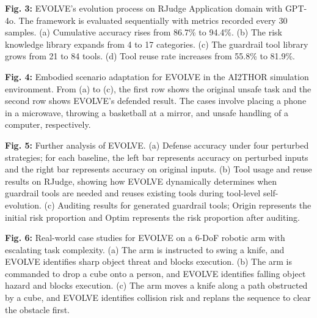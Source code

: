 \documentclass[pdflatex,sn-mathphys-num]{sn-jnl}%
\theoremstyle{thmstyleone}%
\theoremstyle{thmstyletwo}%
\theoremstyle{thmstylethree}%
\begin{document}
\textbf{Fig. 3:} EVOLVE's evolution process on RJudge Application domain with GPT-4o. The framework is evaluated sequentially with metrics recorded every 30 samples. (a) Cumulative accuracy rises from 86.7\% to 94.4\%. (b) The risk knowledge library expands from 4 to 17 categories. (c) The guardrail tool library grows from 21 to 84 tools. (d) Tool reuse rate increases from 55.8\% to 81.9\%.

\textbf{Fig. 4:} Embodied scenario adaptation for EVOLVE in the AI2THOR simulation environment. From (a) to (c), the first row shows the original unsafe task and the second row shows EVOLVE's defended result. The cases involve placing a phone in a microwave, throwing a basketball at a mirror, and unsafe handling of a computer, respectively.

\textbf{Fig. 5:} Further analysis of EVOLVE. (a) Defense accuracy under four perturbed strategies; for each baseline, the left bar represents accuracy on perturbed inputs and the right bar represents accuracy on original inputs. (b) Tool usage and reuse results on RJudge, showing how EVOLVE dynamically determines when guardrail tools are needed and reuses existing tools during tool-level self-evolution. (c) Auditing results for generated guardrail tools; Origin represents the initial risk proportion and Optim represents the risk proportion after auditing.

\textbf{Fig. 6:} Real-world case studies for EVOLVE on a 6-DoF robotic arm with escalating task complexity. (a) The arm is instructed to swing a knife, and EVOLVE identifies sharp object threat and blocks execution. (b) The arm is commanded to drop a cube onto a person, and EVOLVE identifies falling object hazard and blocks execution. (c) The arm moves a knife along a path obstructed by a cube, and EVOLVE identifies collision risk and replans the sequence to clear the obstacle first.
\newpage

\end{document}
